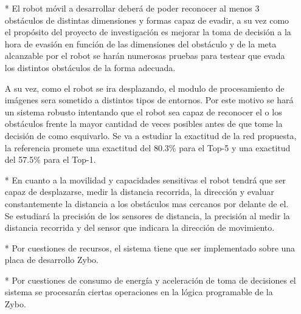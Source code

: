 \begin{itemize}
    \item[*] El robot móvil a desarrollar deberá de poder reconocer al menos 3 obstáculos de distintas dimensiones y formas capaz de evadir, a su vez como el propósito del proyecto de investigación es mejorar la toma de decisión a la hora de evasión en función de las dimensiones del obstáculo y de la meta alcanzable por el robot se harán numerosas pruebas para testear que evada los distintos obstáculos de la forma adecuada.\par
    A su vez, como el robot se ira desplazando, el modulo de procesamiento de imágenes sera sometido a distintos tipos de entornos. Por este motivo se hará un sistema robusto intentando que el robot sea capaz de reconocer el o los obstáculos frente la mayor cantidad de veces posibles antes de que tome la decisión de como esquivarlo. Se va a estudiar la exactitud de la red propuesta, la referencia \cite{SQ} promete una exactitud del 80.3\% para el Top-5 y una exactitud del 57.5\% para el Top-1.
    \item[*] En cuanto a la movilidad y capacidades sensitivas el robot tendrá que ser capaz de desplazarse, medir la distancia recorrida, la dirección y evaluar constantemente la distancia a los obstáculos mas cercanos por delante de el. Se estudiará la precisión de los sensores de distancia, la precisión al medir la distancia recorrida y del sensor que indicara la dirección de movimiento. 
    \item[*] Por cuestiones de recursos, el sistema tiene que ser implementado sobre una placa de desarrollo Zybo.
    \item[*] Por cuestiones de consumo de energía y aceleración de toma de decisiones el sistema se procesarán ciertas operaciones en la lógica programable de la Zybo.
\end{itemize} 